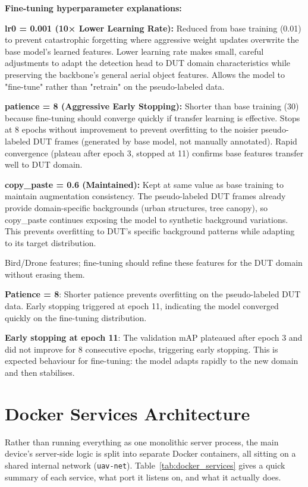 \documentclass[12pt,a4paper]{report}
\begin{document}
\textbf{Fine-tuning hyperparameter explanations:}

\textbf{lr0 = 0.001 (10× Lower Learning Rate):}
Reduced from base training (0.01) to prevent catastrophic forgetting where aggressive weight updates overwrite the base model's learned features. Lower learning rate makes small, careful adjustments to adapt the detection head to DUT domain characteristics while preserving the backbone's general aerial object features. Allows the model to "fine-tune" rather than "retrain" on the pseudo-labeled data.

\textbf{patience = 8 (Aggressive Early Stopping):}
Shorter than base training (30) because fine-tuning should converge quickly if transfer learning is effective. Stops at 8 epochs without improvement to prevent overfitting to the noisier pseudo-labeled DUT frames (generated by base model, not manually annotated). Rapid convergence (plateau after epoch 3, stopped at 11) confirms base features transfer well to DUT domain.

\textbf{copy\_paste = 0.6 (Maintained):}
Kept at same value as base training to maintain augmentation consistency. The pseudo-labeled DUT frames already provide domain-specific backgrounds (urban structures, tree canopy), so copy\_paste continues exposing the model to synthetic background variations. This prevents overfitting to DUT's specific background patterns while adapting to its target distribution.


Bird/Drone features; fine-tuning should refine these features for the
DUT domain without erasing them.

\textbf{Patience = 8}: Shorter patience prevents overfitting on the
pseudo-labeled DUT data. Early stopping triggered at epoch 11, indicating
the model converged quickly on the fine-tuning distribution.

\textbf{Early stopping at epoch 11}: The validation mAP plateaued after
epoch 3 and did not improve for 8 consecutive epochs, triggering early
stopping. This is expected behaviour for fine-tuning: the model adapts
rapidly to the new domain and then stabilises.

\section{Docker Services Architecture}

Rather than running everything as one monolithic server process, the main
device's server-side logic is split into separate Docker containers, all
sitting on a shared internal network (\texttt{uav-net}). Table~\ref{tab:docker_services}
gives a quick summary of each service, what port it listens on, and what it
actually does.
\end{document}
